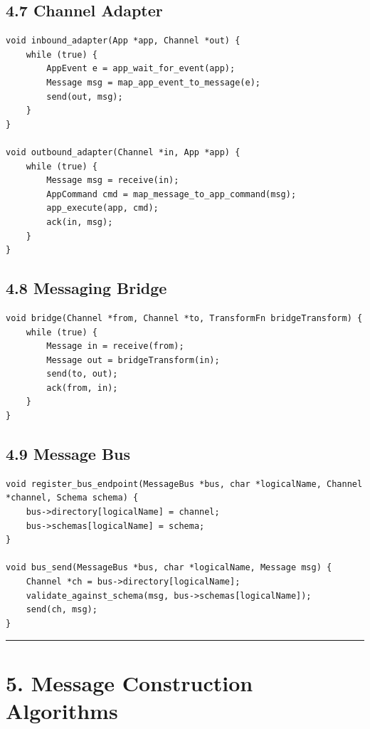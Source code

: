 \documentclass[11pt]{article}
\begin{document}
\subsection{4.7 Channel Adapter}\label{channel-adapter}

\begin{verbatim}
void inbound_adapter(App *app, Channel *out) {
    while (true) {
        AppEvent e = app_wait_for_event(app);
        Message msg = map_app_event_to_message(e);
        send(out, msg);
    }
}

void outbound_adapter(Channel *in, App *app) {
    while (true) {
        Message msg = receive(in);
        AppCommand cmd = map_message_to_app_command(msg);
        app_execute(app, cmd);
        ack(in, msg);
    }
}
\end{verbatim}

\subsection{4.8 Messaging Bridge}\label{messaging-bridge}

\begin{verbatim}
void bridge(Channel *from, Channel *to, TransformFn bridgeTransform) {
    while (true) {
        Message in = receive(from);
        Message out = bridgeTransform(in);
        send(to, out);
        ack(from, in);
    }
}
\end{verbatim}

\subsection{4.9 Message Bus}\label{message-bus}

\begin{verbatim}
void register_bus_endpoint(MessageBus *bus, char *logicalName, Channel *channel, Schema schema) {
    bus->directory[logicalName] = channel;
    bus->schemas[logicalName] = schema;
}

void bus_send(MessageBus *bus, char *logicalName, Message msg) {
    Channel *ch = bus->directory[logicalName];
    validate_against_schema(msg, bus->schemas[logicalName]);
    send(ch, msg);
}
\end{verbatim}

\begin{center}\rule{0.5\linewidth}{0.5pt}\end{center}

\section{5. Message Construction
Algorithms}\label{message-construction-algorithms}
\end{document}
